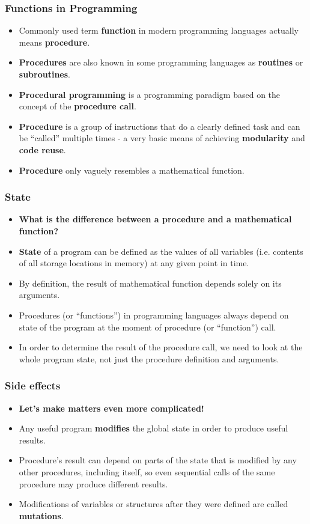 \documentclass{beamer}
\begin{document}
\begin{frame}[fragile]
  \frametitle{Functions in Programming}
  \begin{itemize}
  \item Commonly used term \textbf{function} in modern programming languages
    actually means \textbf{procedure}.
  \item \textbf{Procedures} are also known in some programming languages as
    \textbf{routines} or \textbf{subroutines}.
  \item \textbf{Procedural programming} is a programming paradigm based on the
    concept of the \textbf{procedure call}.
  \item \textbf{Procedure} is a group of instructions that do a clearly defined
    task and can be ``called'' multiple times - a very basic means of achieving
    \textbf{modularity} and \textbf{code reuse}.
  \item \textbf{Procedure} only vaguely resembles a mathematical function.
  \end{itemize}
\end{frame}

\begin{frame}[fragile]
  \frametitle{State}
  \begin{itemize}
  \item \textbf{What is the difference between a procedure and a mathematical
      function?}
  \item \textbf{State} of a program can be defined as the values of all
    variables (i.e. contents of all storage locations in memory) at any given
    point in time.
  \item By definition, the result of mathematical function depends solely on its
    arguments.
  \item Procedures (or ``functions'') in programming languages always depend on
    state of the program at the moment of procedure (or ``function'') call.
  \item In order to determine the result of the procedure call, we need to look
    at the whole program state, not just the procedure definition and arguments.
  \end{itemize}
\end{frame}

\begin{frame}[fragile]
  \frametitle{Side effects}
  \begin{itemize}
  \item \textbf{Let's make matters even more complicated!}
  \item Any useful program \textbf{modifies} the global state in order to produce
    useful results.
  \item Procedure's result can depend on parts of the state that is modified by
    any other procedures, including itself, so even sequential calls of the same
    procedure may produce different results.
  \item Modifications of variables or structures after they were defined are
    called \textbf{mutations}.
  \end{itemize}
\end{frame}
\end{document}
